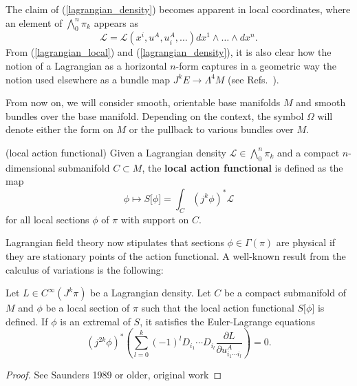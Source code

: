 The claim of (\ref{lagrangian_density}) becomes apparent in local coordinates, where an element of $\bigwedge^n_0\pi_k$ appears as
\begin{equation}\label{lagrangian_local}
  \mathcal L = \mathcal L(x^i,u^A,u^A_i,\dots) dx^1\wedge \dots \wedge dx^n.
\end{equation}
From (\ref{lagrangian_local}) and (\ref{lagrangian_density}), it is also clear how the notion of a Lagrangian as a horizontal $n$-form captures in a geometric way the notion used elsewhere as a bundle map $J^kE \rightarrow \Lambda^4M$ (see Refs.~\cite{saunders,marsden,ccg}).


From now on, we will consider smooth, orientable base manifolds $M$ and smooth bundles over the base manifold. Depending on the context, the symbol $\Omega$ will denote either the form on $M$ or the pullback to various bundles over $M$.

\begin{definition}{(local action functional)}
  Given a Lagrangian density $\mathcal L \in \bigwedge^n_0\pi_k$ and a compact $n$-dimensional submanifold $C \subset M$, the \textbf{local action functional} is defined as the map
  \begin{equation}
    \phi \mapsto S\lbrack\phi\rbrack = \int_C (j^k\phi)^\ast\mathcal L
  \end{equation}
for all local sections $\phi$ of $\pi$ with support on $C$.
\end{definition}

Lagrangian field theory now stipulates that sections $\phi\in\Gamma(\pi)$ are physical if they are stationary points of the action functional. A well-known result from the calculus of variations is the following:
\begin{proposition}
  Let $L\in C^\infty(J^k\pi)$ be a Lagrangian density. Let $C$ be a compact submanifold of $M$ and $\phi$ be a local section of $\pi$ such that the local action functional $S\lbrack\phi\rbrack$ is defined. If $\phi$ is an extremal of $S$, it satisfies the Euler-Lagrange equations
  \begin{equation}\label{euler_lagrange_local}
    (j^{2k}\phi)^\ast\left( \sum_{l=0}^{k} (-1)^l D_{i_1} \cdots D_{i_l} \frac{\partial L}{\partial u^A_{i_1\cdots i_l}}\right) = 0.
  \end{equation}
\end{proposition}
\begin{proof}
  See Saunders 1989 or older, original work
\end{proof}

